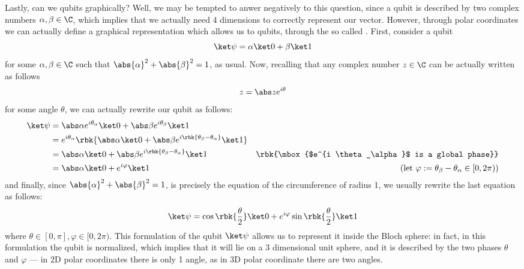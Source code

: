 \documentclass[a4paper, 12pt]{report}
\begin{document}
Lastly, can we  qubits graphically? Well, we may be tempted to anwer negatively to this question, since a qubit is described by two complex numbers $\alpha, \beta \in \C$, which implies that we actually need 4 dimensions to correctly represent our vector. However, through polar coordinates we can actually define a graphical representation which allows us to  qubits, through the so called . First, consider a qubit $$\ket \psi = \alpha \ket 0 + \beta \ket 1$$ for some $\alpha, \beta \in \C$ such that $\abs{\alpha}^2 + \abs{\beta}^2 = 1$, as usual. Now, recalling that any complex number $z \in \C$ can be actually written as follows $$z = \abs z e^{i \theta}$$ for some angle $\theta$, we can actually rewrite our qubit as follows:
\begin{equation*}
	\begin{alignedat}{2}
		\ket \psi & = \abs \alpha e^{i \theta_\alpha} \ket 0 + \abs \beta e^{i \theta_\beta} \ket 1                             &                                                                            \\
		          & = e^{i \theta_\alpha} \rbk{\abs \alpha \ket 0 + \abs \beta e^{i \rbk{\theta_\beta - \theta_\alpha}} \ket 1} &                                                                            \\
		          & = \abs \alpha \ket 0 + \abs \beta e^{i \rbk{\theta_\beta - \theta_\alpha}} \ket 1                           & \quad \rbk{\mbox{$e^{i \theta_\alpha}$ is a global phase}}                 \\
		          & = \abs \alpha \ket 0 + e^{i \varphi} \ket 1                                                                 & \quad (\mbox{let $\varphi: = \theta_\beta - \theta_\alpha \in [0, 2\pi)$}) \\
	\end{alignedat}
\end{equation*}
and finally, since $\abs{\alpha}^2 + \abs{\beta}^2 = 1$, is precisely the equation of the circumference of radius 1, we usually rewrite the last equation as follows: $$\ket \psi = \cos{\rbk{\dfrac{\theta}{2}}} \ket 0+ e^{i \varphi} \sin{\rbk{\dfrac{\theta}{2}}} \ket 1$$ where $\theta \in [0, \pi], \varphi \in [0, 2\pi)$. This formulation of the qubit $\ket \psi$ allows us to represent it inside the Bloch sphere: in fact, in this formulation the qubit is normalized, which implies that it will lie on a 3 dimensional unit sphere, and it is described by the two phases $\theta$ and $\varphi$ --- in 2D polar coordinates there is only 1 angle, as in 3D polar coordinate there are two angles.
\end{document}
